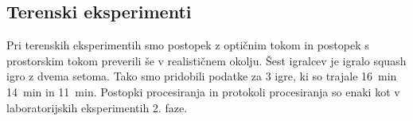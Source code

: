 \subsection{Terenski eksperimenti}
Pri terenskih eksperimentih smo postopek z optičnim tokom in postopek s prostorskim tokom preverili še v realističnem okolju. Šest igralcev je igralo squash igro z dvema setoma. Tako smo pridobili podatke za 3 igre, ki so trajale \SI{16}{min} \SI{14}{min} in \SI{11}{min}. Postopki procesiranja in protokoli procesiranja so enaki kot v laboratorijskih eksperimentih 2. faze. 



